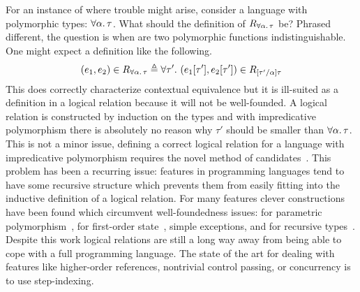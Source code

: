 For an instance of where trouble might arise, consider a language with
polymorphic types: $\forall \alpha.\, \tau$. What should the
definition of $R_{\forall \alpha.\, \tau}$ be? Phrased different,
the question is when are two polymorphic functions
indistinguishable. One might expect a definition like the following.
\[
  (e_1, e_2) \in R_{\forall \alpha.\, \tau} \mathrel{\triangleq}
  \forall \tau'.\ (e_1[\tau'], e_2[\tau']) \in R_{[\tau'/\alpha]\tau}
\]
This does correctly characterize contextual equivalence but it is
ill-suited as a definition in a logical relation because it will not
be well-founded. A logical relation is constructed by induction on the
types and with impredicative polymorphism there is absolutely no
reason why $\tau'$ should be smaller than
$\forall \alpha.\, \tau$. This is not a minor issue, defining a
correct logical relation for a language with impredicative
polymorphism requires the novel method of
candidates~\citep{Girard:71,Girard:72}. This problem has been a
recurring issue: features in programming languages tend to have some
recursive structure which prevents them from easily fitting into the
inductive definition of a logical relation. For many features clever
constructions have been found which circumvent well-foundedness
issues: for parametric polymorphism~\citep{Girard:71,Girard:72}, for
first-order state~\citep{Pitts:98}, simple exceptions, and for
recursive types~\citep{Crary:07}. Despite this work logical relations
are still a long way away from being able to cope with a full
programming language. The state of the art for dealing with features
like higher-order references, nontrivial control passing, or
concurrency is to use step-indexing.

